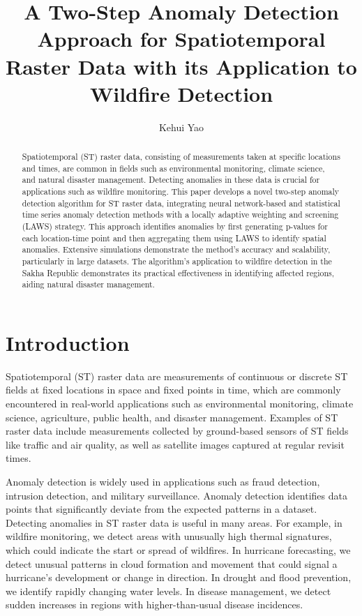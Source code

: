 \documentclass[11pt]{article}
\title{A Two-Step Anomaly Detection Approach for Spatiotemporal Raster Data with its Application to Wildfire Detection}
\author[1]{Kehui Yao}
\affil[1]{Department of Statistics, University of Wisconsin-Madison}
\date{}
\begin{document}
\maketitle

\begin{abstract}
Spatiotemporal (ST) raster data, consisting of measurements taken at specific locations and times, are common in fields such as environmental monitoring, climate science, and natural disaster management. Detecting anomalies in these data is crucial for applications such as wildfire monitoring. This paper develops a novel two-step anomaly detection algorithm for ST raster data, integrating neural network-based and statistical time series anomaly detection methods with a locally adaptive weighting and screening (LAWS) strategy. This approach identifies anomalies by first generating p-values for each location-time point and then aggregating them using LAWS to identify spatial anomalies. Extensive simulations demonstrate the method's accuracy and scalability, particularly in large datasets. The algorithm's application to wildfire detection in the Sakha Republic demonstrates its practical effectiveness in identifying affected regions, aiding natural disaster management.

\end{abstract}

\section{Introduction}
Spatiotemporal (ST) raster data are measurements of continuous or discrete ST fields at fixed locations in space and fixed points in time, which are commonly encountered in real-world applications such as environmental monitoring, climate science, agriculture, public health, and disaster management. Examples of ST raster data include measurements collected by ground-based sensors of ST fields like traffic and air quality, as well as satellite images captured at regular revisit times. 
 
 Anomaly detection is widely used in applications such as fraud detection, intrusion detection, and military surveillance. Anomaly detection identifies data points that significantly deviate from the expected patterns in a dataset.  Detecting anomalies in ST raster data is useful in many areas. For example, in wildfire monitoring, we detect areas with unusually high thermal signatures, which could indicate the start or spread of wildfires. In hurricane forecasting, we detect unusual patterns in cloud formation and movement that could signal a hurricane's development or change in direction. In drought and flood prevention, we identify rapidly changing water levels. In disease management, we detect sudden increases in regions with higher-than-usual disease incidences.
\end{document}

